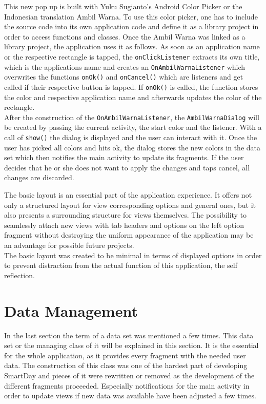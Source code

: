This new pop up is built with Yuku Sugianto's Android Color Picker or the Indonesian translation Ambil Warna\cite{colorpicker}. To use this color picker, one has to include the source code into its own application code and define it as a library project in order to access functions and classes. Once the Ambil Warna was linked as a library project, the application uses it as follows. As soon as an application name or the respective rectangle is tapped, the \lstinline$onClickListener$ extracts its own title, which is the applications name and creates an \lstinline$OnAmbilWarnaListener$ which overwrites the functions \lstinline$onOk()$ and \lstinline$onCancel()$ which are listeners and get called if their respective button is tapped. If \lstinline$onOk()$ is called, the function stores the color and respective application name and afterwards updates the color of the rectangle.\\
After  the construction of the \lstinline$OnAmbilWarnaListener$, the \lstinline$AmbilWarnaDialog$ will be created by passing the current activity, the start color and the listener. With a call of \lstinline$show()$ the dialog is displayed and the user can interact with it. Once the user has picked all colors and hits ok, the dialog stores the new colors in the data set which then notifies the main activity to update its fragments. If the user decides that he or she does not want to apply the changes and taps cancel, all changes are discarded.

The basic layout is an essential part of the application experience. It offers not only a structured layout for view corresponding options and general ones, but it also presents a surrounding structure for views themselves. The possibility to seamlessly attach new views with tab headers and options on the left option fragment without destroying the uniform appearance of the application may be an advantage for possible future projects.\\
The basic layout was created to be minimal in terms of displayed options in order to prevent distraction from the actual function of this application, the self reflection.
\newpage
\section{Data Management}
\label{sec:datamanagement}
In the last section the term of a data set was mentioned a few times. This data set or the managing class of it will be explained in this section. It is the essential for the whole application, as it provides every fragment with the needed user data. The construction of this class was one of the hardest part of developing SmartDay and pieces of it were rewritten or removed as the development of the different fragments proceeded. Especially notifications for the main activity in order to update views if new data was available have been adjusted a few times.

